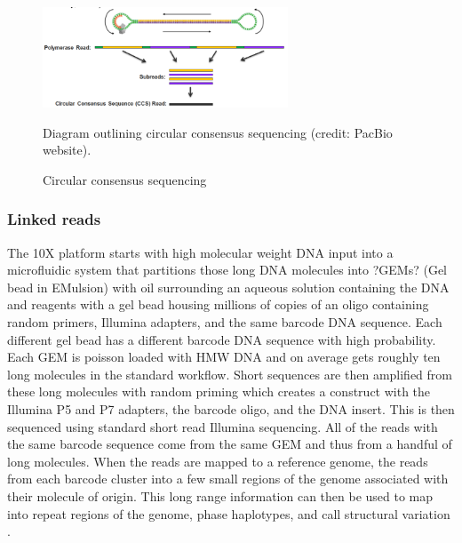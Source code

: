 \begin{figure}[htbp!]

\caption{Circular consensus sequencing}
\label{figure:ccs}
\begin{centering}
\includegraphics[width=0.65\textwidth]{CCS.png}
\par{Diagram outlining circular consensus sequencing (credit: PacBio website).}
\end{centering}
\end{figure}

\subsubsection{Linked reads}

\par{
The 10X platform starts with high molecular weight DNA input into a microfluidic system that partitions those long DNA molecules into ?GEMs? (Gel bead in EMulsion) with oil surrounding an aqueous solution containing the DNA and reagents with a gel bead housing millions of copies of an oligo containing random primers, Illumina adapters, and the same barcode DNA sequence. Each different gel bead has a different barcode DNA sequence with high probability. Each GEM is poisson loaded with HMW DNA and on average gets roughly ten long molecules in the standard workflow. Short sequences are then amplified from these long molecules with random priming which creates a construct with the Illumina P5 and P7 adapters, the barcode oligo, and the DNA insert. This is then sequenced using standard short read Illumina sequencing. All of the reads with the same barcode sequence come from the same GEM and thus from a handful of long molecules. When the reads are mapped to a reference genome, the reads from each barcode cluster into a few small regions of the genome associated with their molecule of origin. This long range information can then be used to map into repeat regions of the genome, phase haplotypes, and call structural variation \cite{10xlinked}.
}

